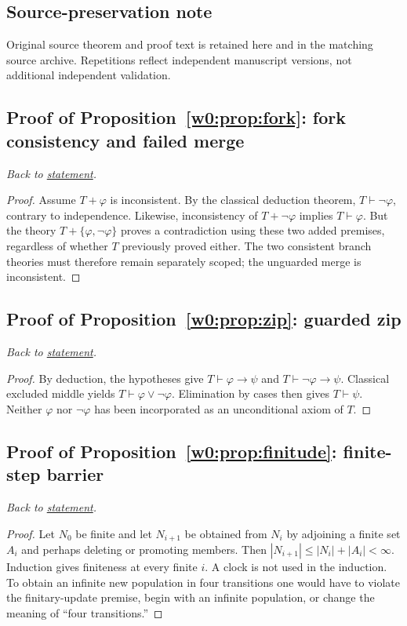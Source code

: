 \documentclass[11pt,letterpaper]{article}
\theoremstyle{definition}\newtheorem{definition}[theorem]{Definition}\newtheorem{example}[theorem]{Example}
\theoremstyle{remark}\newtheorem{remark}[theorem]{Remark}
\begin{document}
\subsection*{Source-preservation note}
Original source theorem and proof text is retained here and in the matching source archive. Repetitions reflect independent manuscript versions, not additional independent validation.
\subsection{Proof of Proposition~\ref{w0:prop:fork}: fork consistency and failed merge}\label{w0:pr:fork}
\textit{Back to \hyperref[w0:prop:fork]{statement}.}
\begin{proof}
Assume $T+\varphi$ is inconsistent. By the classical deduction theorem, $T\vdash\neg\varphi$, contrary to independence. Likewise, inconsistency of $T+\neg\varphi$ implies $T\vdash\varphi$. But the theory $T+\{\varphi,\neg\varphi\}$ proves a contradiction using these two added premises, regardless of whether $T$ previously proved either. The two consistent branch theories must therefore remain separately scoped; the unguarded merge is inconsistent.
\end{proof}


\subsection{Proof of Proposition~\ref{w0:prop:zip}: guarded zip}\label{w0:pr:zip}
\textit{Back to \hyperref[w0:prop:zip]{statement}.}
\begin{proof}
By deduction, the hypotheses give $T\vdash\varphi\to\psi$ and $T\vdash\neg\varphi\to\psi$. Classical excluded middle yields $T\vdash\varphi\lor\neg\varphi$. Elimination by cases then gives $T\vdash\psi$. Neither $\varphi$ nor $\neg\varphi$ has been incorporated as an unconditional axiom of $T$.
\end{proof}


\subsection{Proof of Proposition~\ref{w0:prop:finitude}: finite-step barrier}\label{w0:pr:finitude}
\textit{Back to \hyperref[w0:prop:finitude]{statement}.}
\begin{proof}
Let $N_0$ be finite and let $N_{i+1}$ be obtained from $N_i$ by adjoining a finite set $A_i$ and perhaps deleting or promoting members. Then $|N_{i+1}|\le |N_i|+|A_i|<\infty$. Induction gives finiteness at every finite $i$. A clock is not used in the induction. To obtain an infinite new population in four transitions one would have to violate the finitary-update premise, begin with an infinite population, or change the meaning of ``four transitions.''
\end{proof}
\end{document}
